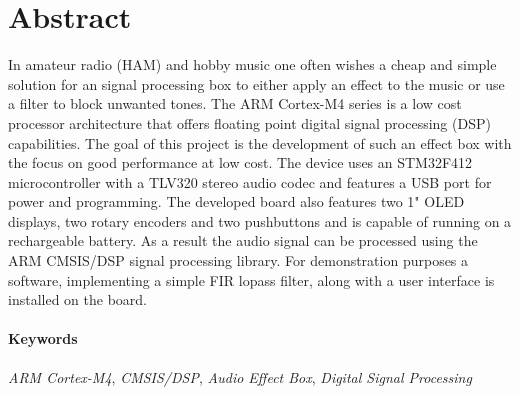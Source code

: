 \section*{Abstract}
\label{sec:Abstract}

In amateur radio (HAM) and hobby music one often wishes a cheap and simple solution for an signal processing box to either apply an effect to the music or use a filter to block unwanted tones.
The ARM Cortex-M4 series is a low cost processor architecture that offers floating point digital signal processing (DSP) capabilities.
The goal of this project is the development of such an effect box with the focus on good performance at low cost. 
The device uses an STM32F412 microcontroller with a TLV320 stereo audio codec and features a USB port for power and programming. The developed board also features two 1" OLED displays, two rotary encoders and two pushbuttons and is capable of running on a rechargeable battery.
As a result the audio signal can be processed using the ARM CMSIS/DSP signal processing library. For demonstration purposes a software, implementing a simple FIR lopass filter, along with a user interface is installed on the board.


\paragraph{Keywords}

\textit{ARM Cortex-M4}, \textit{CMSIS/DSP}, \textit{Audio Effect Box}, \textit{Digital Signal Processing}


